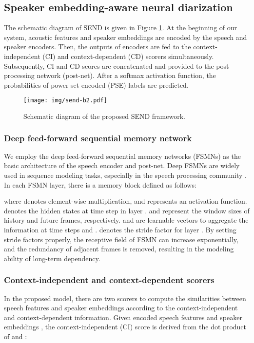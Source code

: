 \documentclass[a4paper]{article}
\begin{document}
\subsection{Speaker embedding-aware neural diarization}
The schematic diagram of SEND is given in Figure \ref{fig:send}.
At the beginning of our system, acoustic features and speaker embeddings are encoded by the speech and speaker encoders.
Then, the outputs of encoders are fed to the context-independent (CI) and context-dependent (CD) scorers simultaneously.
Subsequently, CI and CD scores are concatenated and provided to the post-processing network (post-net).
After a softmax activation function, the probabilities of power-set encoded (PSE) labels are predicted.
\begin{figure}[t!]
	\centering
	\texttt{[image: img/send-b2.pdf]}
	\caption{Schematic diagram of the proposed SEND framework.}
	\label{fig:send}
\end{figure}
\subsubsection{Deep feed-forward sequential memory network}
We employ the deep feed-forward sequential memory networks (FSMNs) \cite{zhang2015fsmn} as the basic architecture of the speech encoder and post-net.
Deep FSMNs are widely used in sequence modeling tasks, especially in the speech processing community \cite{BiLZLY18, ZhangLYD18,ZhangLLL19a}.
In each FSMN layer, there is a memory block defined as follows:

where  denotes element-wise multiplication, and  represents an activation function.
 denotes the hidden states at time step  in layer . 
 and  represent the window sizes of history and future frames, respectively.
 and  are learnable vectors to aggregate the information at time steps  and .  denotes the stride factor for layer .
By setting stride factors properly, the receptive field of FSMN can increase exponentially, and the redundancy of adjacent frames is removed, resulting in the modeling ability of long-term dependency.



\subsubsection{Context-independent and context-dependent scorers}
In the proposed model, there are two scorers to compute the similarities between speech features and speaker embeddings according to the context-independent and context-dependent information.
Given encoded speech features  and speaker embeddings , the context-independent (CI) score  is derived from the dot product of  and :
\end{document}
